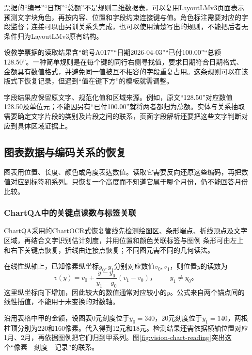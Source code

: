 票据的“编号”“日期”“总额”不是规则二维数据表，可以复用LayoutLMv3页面表示预测文字块角色，再按内容、位置和字段约束连接键与值。角色标注需要对应的字段监督；连接可以由另训关系头完成，也可以使用清楚写出的规则，不能把后者无条件归为LayoutLMv3原有结构。

设教学票据的读取结果含“编号A017”“日期2026-04-03”“已付100.00”“总额128.50”。一种简单规则是在每个键的同行右侧寻找值，要求日期符合日期格式、金额具有数值格式，并避免同一值被互不相容的字段重复占用。这条规则可以在该版式下恢复记录，但遇到“值在键下方”的模板就需调整。

字段结果应保留原文字、规范化值和区域来源。例如，原文“128.50”对应数值128.50及单位元；不能因另有“已付100.00”就将两者都归为总额。实体与关系抽取需要确定文字片段的类别及片段之间的联系，页面字段解析还要把这些文字判断对应到具体区域证据上。

\subsection{图表数据与编码关系的恢复}
\label{sec:vision-understanding-charts}

图表用位置、长度、颜色或角度表达数值。读取它需要反向还原这些编码，再把数值对应到标签和系列。只恢复一个高度而不知道它属于哪个月份，仍不能回答月份比较。

\subsubsection{ChartQA中的关键点读数与标签关联}
\label{sec:vision-understanding-chart-reading}

ChartQA采用的ChartOCR式恢复管线先检测绘图区、条形端点、折线顶点及文字区域，再结合文字识别估计刻度，并用位置和颜色关联标签与图例
条形可由左上和右下关键点恢复，折线由连接点恢复；不同图元需不同的几何读法。

在线性纵轴上，已知像素纵坐标$y_0,y_1$分别对应数值$v_0,v_1$，则位置$y$的读数为
\begin{equation}
  v(y)=v_0+\frac{y-y_0}{y_1-y_0}(v_1-v_0)\text{，}
  \qquad y_1\neq y_0\text{。}
  \label{eq:vision-chart-calibration}
\end{equation}
这里纵坐标向下增加，因此较大的数值通常对应较小的$y$。公式来自两个锚点间的线性插值，不能用于未变换的对数轴。

沿用表格中甲的金额，设图表0元刻度位于$y_0=340$，20元刻度位于$y_1=140$，两根柱顶分别为220和160像素。代入得到12元和18元。检测结果还需依据横轴位置对应1月、2月，再依据图例把它们归到甲系列。图\ref{fig:vision-chart-reading}突出这个“像素—刻度—记录”的联系。


